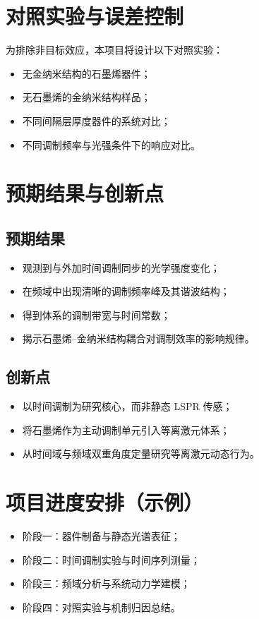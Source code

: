 \documentclass[12pt,a4paper]{article}
\begin{document}
\section{对照实验与误差控制}

为排除非目标效应，本项目将设计以下对照实验：

\begin{itemize}
  \item 无金纳米结构的石墨烯器件；
  \item 无石墨烯的金纳米结构样品；
  \item 不同间隔层厚度器件的系统对比；
  \item 不同调制频率与光强条件下的响应对比。
\end{itemize}

\section{预期结果与创新点}

\subsection{预期结果}

\begin{itemize}
  \item 观测到与外加时间调制同步的光学强度变化；
  \item 在频域中出现清晰的调制频率峰及其谐波结构；
  \item 得到体系的调制带宽与时间常数；
  \item 揭示石墨烯–金纳米结构耦合对调制效率的影响规律。
\end{itemize}

\subsection{创新点}

\begin{itemize}
  \item 以时间调制为研究核心，而非静态 LSPR 传感；
  \item 将石墨烯作为主动调制单元引入等离激元体系；
  \item 从时间域与频域双重角度定量研究等离激元动态行为。
\end{itemize}

\section{项目进度安排（示例）}

\begin{itemize}
  \item 阶段一：器件制备与静态光谱表征；
  \item 阶段二：时间调制实验与时间序列测量；
  \item 阶段三：频域分析与系统动力学建模；
  \item 阶段四：对照实验与机制归因总结。
\end{itemize}
\end{document}

